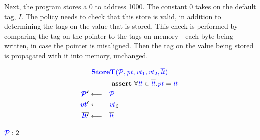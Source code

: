\documentclass[acmsmall,review,anonymous]{acmart}\settopmatter{printfolios=true,printccs=false,printacmref=false}
\begin{document}

Next, the program stores a 0 to address 1000. The constant 0
takes on the default tag, \(I\). The policy needs to check that
this store is valid, in addition to determining the tags on the value that is stored.
This check is performed by comparing the tag on the pointer to the tags on memory---each
byte being written, in case the pointer is misaligned. Then the tag on the value being stored
is propagated with it into memory, unchanged.

\[\begin{aligned}
\truledef{\storet}
\assert{\forall \lt \in \overline{\lt} . \pt = \lt}
\settag{\PCT'}{\PCT}
\settag{\vt'}{\vt_2}
\settag{\overline{\lt'}}{\overline{\lt}}
\end{aligned}\]

\vspace{\abovedisplayskip}

\(\mathcal{\color{blue} P}: 2\)

\vspace{\abovedisplayskip}
\end{document}
